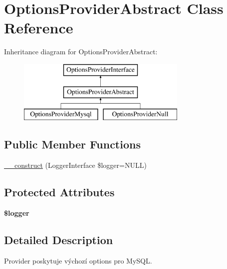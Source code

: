 \hypertarget{class_pes_1_1_database_1_1_handler_1_1_options_provider_1_1_options_provider_abstract}{}\section{Options\+Provider\+Abstract Class Reference}
\label{class_pes_1_1_database_1_1_handler_1_1_options_provider_1_1_options_provider_abstract}
Inheritance diagram for Options\+Provider\+Abstract\+:\begin{figure}[H]
\begin{center}
\leavevmode
\includegraphics[height=3.000000cm]{class_pes_1_1_database_1_1_handler_1_1_options_provider_1_1_options_provider_abstract}
\end{center}
\end{figure}
\subsection*{Public Member Functions}
\begin{DoxyCompactItemize}
\item 
\mbox{\hyperlink{class_pes_1_1_database_1_1_handler_1_1_options_provider_1_1_options_provider_abstract_a4d086b03f47931c183f0414bf2da5103}{\+\_\+\+\_\+construct}} (Logger\+Interface \$logger=N\+U\+LL)
\end{DoxyCompactItemize}
\subsection*{Protected Attributes}
\begin{DoxyCompactItemize}
\item 
\mbox{\label{class_pes_1_1_database_1_1_handler_1_1_options_provider_1_1_options_provider_abstract_aebfec76216371ef236acc5910e90933d}} 
{\bfseries \$logger}
\end{DoxyCompactItemize}


\subsection{Detailed Description}
Provider poskytuje výchozí options pro My\+S\+QL. 

